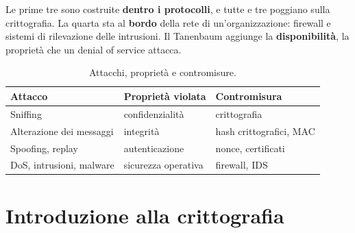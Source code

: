 
Le prime tre sono costruite \textbf{dentro i protocolli}, e tutte e tre poggiano sulla crittografia. La quarta sta al \textbf{bordo}
della rete di un'organizzazione: firewall e sistemi di rilevazione delle intrusioni. Il Tanenbaum aggiunge la \textbf{disponibilità},
la proprietà che un denial of service attacca.

\begin{table}[H]
\centering
\begin{tabular}{lll}
\toprule
\textbf{Attacco} & \textbf{Proprietà violata} & \textbf{Contromisura} \\
\midrule
Sniffing & confidenzialità & crittografia \\
Alterazione dei messaggi & integrità & hash crittografici, MAC \\
Spoofing, replay & autenticazione & nonce, certificati \\
DoS, intrusioni, malware & sicurezza operativa & firewall, IDS \\
\bottomrule
\end{tabular}
\caption{Attacchi, proprietà e contromisure.}
\end{table}

\section{Introduzione alla crittografia}

